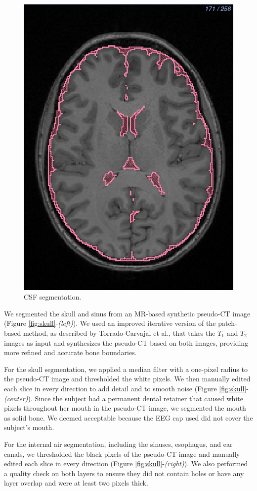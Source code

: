 \begin{figure}[H]
\begin{center}
\includegraphics[width=.49\textwidth]{Figures/CSF_seg}
\caption{CSF segmentation.}
\label{fig:csf}
\end{center}
\end{figure}

We segmented the skull and sinus from an MR-based synthetic pseudo-CT image (Figure \ref{fig:skull}-\textit{(left)}). We used an improved iterative version of the patch-based method, as described by Torrado-Carvajal et al., \cite{ref:pseudoct} that takes the $T_1$ and $T_2$ images as input and synthesizes the pseudo-CT based on both images, providing more refined and accurate bone boundaries.

For the skull segmentation, we applied a median filter with a one-pixel radius to the pseudo-CT image and thresholded the white pixels. We then manually edited each slice in every direction to add detail and to smooth noise (Figure \ref{fig:skull}-\textit{(center)}). Since the subject had a permanent dental retainer that caused white pixels throughout her mouth in the pseudo-CT image, we segmented the mouth as solid bone. We deemed acceptable because the EEG cap used did not cover the subject's mouth. 

For the internal air segmentation, including the sinuses, esophagus, and ear canals, we thresholded the black pixels of the pseudo-CT image and manually edited each slice in every direction (Figure \ref{fig:skull}-\textit{(right)}). We also performed a quality check on both layers to ensure they did not contain holes or have any layer overlap and were at least two pixels thick.

